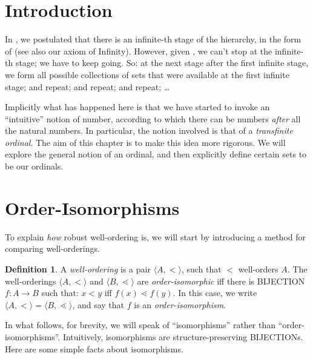 \documentclass[10pt,a4paper]{article}
\makeatletter
\newcommand*{\olup}[1]{\MakeUppercase{#1}}
\theoremstyle{plain}
\theoremstyle{definition}
\newtheorem{defn}[thm]{Definition}
\theoremstyle{remark}
\newcommand*{\olfileid}[3]{}
\newcommand*{\olsection}[1]{\section*{#1}}
\newcommand{\olref}{\@ifnextchar[{\olref@i}{\olref@final}}
\def\olref@i[#1]{\@ifnextchar[{\olref@ii}{\olref@final}}
\def\olref@ii[#1]{\@ifnextchar[{\olref@iii}{\olref@final}}
\def\olref@iii[#1]{\olref@final}
\def\olref@final#1{\ref{#1}}
\providecommand{\tuple}[1]{\langle #1 \rangle}
\providecommand{\ordeq}[2]{#1 = #2}
\makeatother
\begin{document}



\olfileid{sth}{ordinals}{intro}

\olsection{Introduction}

In \olref[z][]{chap}, we postulated that there is an infinite-th stage
of the hierarchy, in the form of \stagesinf{} (see also our axiom of
Infinity). However, given \stagessucc{}, we can't stop at the
infinite-th stage; we have to keep going. So: at the next stage after
the first infinite stage, we form all possible collections of sets
that were available at the first infinite stage; and repeat; and
repeat; and repeat; \dots

Implicitly what has happened here is that we have started to invoke an
``intuitive'' notion of number, according to which there can be
numbers \emph{after} all the natural numbers. In particular, the
notion involved is that of a \emph{transfinite ordinal}. The aim of
this chapter is to make this idea more rigorous. We will explore the
general notion of an ordinal, and then explicitly define certain sets
to be our ordinals. 



\olfileid{sth}{ordinals}{iso}
\olsection{Order-Isomorphisms}

To explain \emph{how} robust well-ordering is, we will start by
introducing a method for comparing well-orderings.

\begin{defn}
A \emph{well-ordering} is a pair $\tuple{A, <}$, such that $<$
well-orders $A$. The well-orderings $\tuple{A, <}$ and $\tuple{B,
\lessdot}$ are \emph{order-isomorphic} {iff} there is \olup{bijection}
$f \colon A \to B$ such that: $x < y$ iff $f(x) \lessdot  f(y)$. In
this case, we write $\ordeq{\tuple{A, <}}{\tuple{B, \lessdot}}$, and
say that $f$ is an \emph{order-isomorphism}.
\end{defn}
\noindent
In what follows, for brevity, we will speak of ``isomorphisms'' rather
than ``order-isomorphisms''. Intuitively, isomorphisms are
structure-preserving \olup{bijection}s. Here are some simple facts about
isomorphisms.
\end{document}
